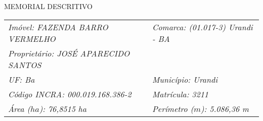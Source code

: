 
\begin{center}
\LARGE {MEMORIAL DESCRITIVO}
\end{center}
\begin{tabular}{ll}
\emph{Imóvel: FAZENDA BARRO VERMELHO} & \emph{Comarca: (01.017-3) Urandi - BA} \\ 
\emph{Proprietário: JOSÉ APARECIDO SANTOS}&\\ 
\emph{UF: Ba}& \emph{Município: Urandi}\\ 
\emph{Código INCRA: 000.019.168.386-2}\hspace{3cm}	 & \emph{Matrícula: 3211}\\ 
\emph{Área ($ha$): 76,8515 ha} & \emph{Perímetro ($m$): 5.086,36 m}\\ 
\end{tabular}